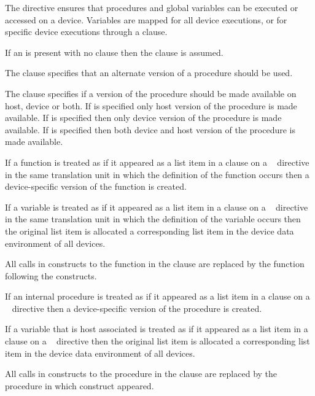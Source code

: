\descr

The   directive ensures that procedures
and global variables can be executed or accessed on a device.
Variables are mapped for all device executions, or for specific
device executions through a  clause.

If an  is present with no clause then the 
clause is assumed.

The  clause specifies that an alternate version of a procedure should be
used.

The  clause specifies if a version of the procedure should be made
available on host, device or both. If  is specified only host version
of the procedure is made available.  If  is specified then only device
version of the procedure is made available.  If  is specified then both
device and host version of the procedure is made available.

\begin{ccppspecific}
If a function is treated as if it appeared as a list item in a  clause
on a ~ directive in the same translation unit in
which the definition of the function occurs then a device-specific version of
the function is created.

If a variable is treated as if it appeared as a list item in a  clause
on a ~ directive in the same translation unit in
which the definition of the variable occurs then the original list item is
allocated a corresponding list item in the device data environment of all
devices.

All calls in  constructs to the function in the  clause
are replaced by the function following the   constructs.
\end{ccppspecific}

\begin{fortranspecific}
If an internal procedure is treated as if it appeared as a
list item in a  clause on a ~ directive
then a device-specific version of the procedure is created.

If a variable that is host associated is treated as if it appeared as a
list item in a  clause on a ~ directive
then the original list item is allocated a corresponding list item in the
device data environment of all devices.



All calls in  constructs to the procedure in the 
clause are replaced by the procedure in which   construct appeared.
\end{fortranspecific}

